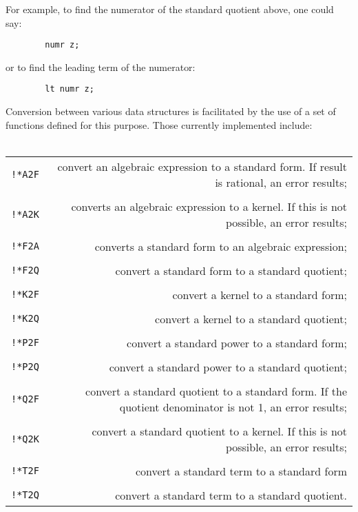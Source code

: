 For example, to find the numerator of the standard quotient above, one
could say:
\begin{verbatim}
        numr z;
\end{verbatim}
or to find the leading term of the numerator:
\begin{verbatim}
        lt numr z;
\end{verbatim}
Conversion between various data structures is facilitated by the use of a
set of functions defined for this purpose. Those currently implemented
include: \\ \\
\begin{tabular}{l r}
{\tt !*A2F} & \parbox[t]{\reduceboxwidth}{convert an algebraic expression to
a standard form.  If result is rational, an error results;} \\ \\

{\tt !*A2K} & \parbox[t]{\reduceboxwidth}{converts an algebraic expression to
a kernel.  If this is not possible, an error results;} \\ \\

{\tt !*F2A} & \parbox[t]{\reduceboxwidth}{converts a standard form to an
algebraic expression;} \\ \\

{\tt !*F2Q} & \parbox[t]{\reduceboxwidth}{convert a standard form to a
standard quotient;} \\ \\

{\tt !*K2F} & \parbox[t]{\reduceboxwidth}{convert a kernel to a standard form;}
\\ \\
{\tt !*K2Q} & \parbox[t]{\reduceboxwidth}{convert a kernel to a standard
quotient;} \\ \\

{\tt !*P2F} & \parbox[t]{\reduceboxwidth}{convert a standard power to a
standard form;} \\ \\

{\tt !*P2Q} & \parbox[t]{\reduceboxwidth}{convert a standard power to a standard
quotient;} \\ \\

{\tt !*Q2F} & \parbox[t]{\reduceboxwidth}{convert a standard quotient to a
standard form.  If the quotient denominator is not 1, an error results;} \\ \\

{\tt !*Q2K} & \parbox[t]{\reduceboxwidth}{convert a standard quotient to a
kernel.  If this is not possible, an error results;} \\ \\

{\tt !*T2F} & \parbox[t]{\reduceboxwidth}{convert a standard term to a
standard form} \\ \\

{\tt !*T2Q} & \parbox[t]{\reduceboxwidth}{convert a standard term to a
standard quotient.}
\end{tabular}

